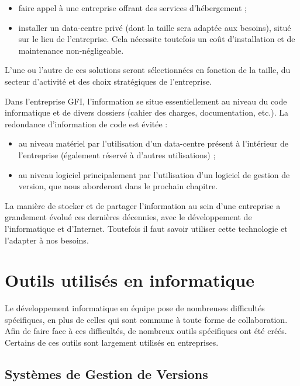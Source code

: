\begin{itemize}
\item faire appel à une entreprise offrant des services d'hébergement ;
\item installer un data-centre privé (dont la taille sera adaptée aux besoins), situé sur le lieu de l'entreprise. Cela nécessite toutefois un coût d'installation et de maintenance non-négligeable.
\end{itemize}

L'une ou l'autre de ces solutions seront sélectionnées en fonction de la taille, du secteur d'activité et des choix stratégiques de l'entreprise.


\begin{app}
Dans l'entreprise GFI, l'information se situe essentiellement au niveau du code informatique et de divers dossiers (cahier des charges, documentation, etc.). La redondance d'information de code est évitée :
\begin{itemize}
\item au niveau matériel par l'utilisation d'un data-centre présent à l'intérieur de l'entreprise (également réservé à d'autres utilisations) ;
\item au niveau logiciel principalement par l'utilisation d'un logiciel de gestion de version, que nous aborderont dans le prochain chapitre.
\end{itemize}
\end{app}

La manière de stocker et de partager l'information au sein d'une entreprise a grandement évolué ces dernières décennies, avec le développement de l'informatique et d'Internet. Toutefois il faut savoir utiliser cette technologie et l'adapter à nos besoins.

\section{Outils utilisés en informatique}

Le développement informatique en équipe pose de nombreuses difficultés spécifiques, en plus de celles qui sont commune à toute forme de collaboration. Afin de faire face à ces difficultés, de nombreux outils spécifiques ont été créés. Certains de ces outils sont largement utilisés en entreprises.

\subsection{Systèmes de Gestion de Versions}

